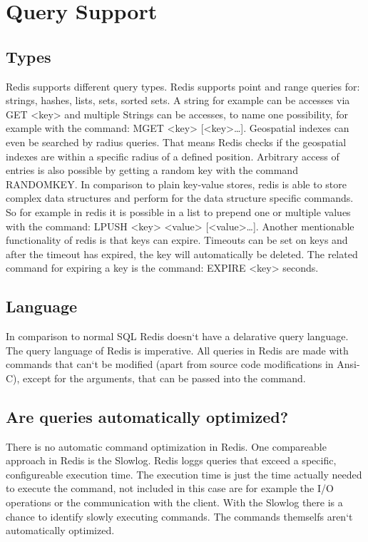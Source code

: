 \chapter{Query Support}

\section{Types}
Redis supports different query types. Redis supports point and range queries for:
strings, hashes, lists, sets, sorted sets. A string for example can be accesses via GET <key> and multiple Strings can be accesses, to name one possibility, for example with the command: MGET <key> [<key>…]. Geospatial indexes can even be searched by radius queries. That means Redis checks if the geospatial indexes are within a specific radius of a defined
position. Arbitrary access of entries is also possible by getting a random key with the command RANDOMKEY. In comparison to plain key-value stores, redis is able to store complex data structures and perform for the data structure specific commands. So for example in redis it is possible in a list to prepend one or multiple values with the command: LPUSH <key> <value> [<value>…]. Another mentionable functionality of redis is that keys can expire. Timeouts can be set on keys and after the timeout has expired, the key will automatically be deleted. The related command for expiring a key is the command: EXPIRE <key> {seconds}.

\section{Language}
In comparison to normal SQL Redis doesn‘t have a delarative query language. The query language of Redis is imperative. All queries in Redis are made with commands that can‘t be modified (apart from source code modifications in Ansi-C), except for the arguments, that can be passed into the command.

\section{Are queries automatically optimized?}
There is no automatic command optimization in Redis. One compareable approach in Redis is the Slowlog. Redis loggs queries that exceed a specific, configureable execution time. The execution time is just the time actually needed to execute the command, not included in this case are for example the I/O operations or the communication with the client. With the Slowlog there is a chance to identify slowly executing commands. The commands themselfs aren‘t automatically optimized.
